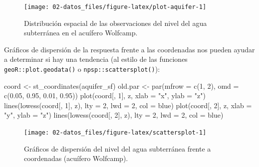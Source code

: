 \documentclass[
  spanish,
]{book}
\newenvironment{Shaded}{\begin{snugshade}}{\end{snugshade}}
\newcommand{\AttributeTok}[1]{\textcolor[rgb]{0.77,0.63,0.00}{#1}}
\newcommand{\DecValTok}[1]{\textcolor[rgb]{0.00,0.00,0.81}{#1}}
\newcommand{\FloatTok}[1]{\textcolor[rgb]{0.00,0.00,0.81}{#1}}
\newcommand{\FunctionTok}[1]{\textcolor[rgb]{0.00,0.00,0.00}{#1}}
\newcommand{\NormalTok}[1]{#1}
\newcommand{\OtherTok}[1]{\textcolor[rgb]{0.56,0.35,0.01}{#1}}
\newcommand{\StringTok}[1]{\textcolor[rgb]{0.31,0.60,0.02}{#1}}
\theoremstyle{break}
\theoremstyle{definition}
\theoremstyle{definition}
\theoremstyle{definition}
\theoremstyle{definition}
\theoremstyle{remark}
\begin{document}
\begin{figure}[!htb]

{\centering \texttt{[image: 02-datos\_files/figure-latex/plot-aquifer-1]} 

}

\caption{Distribución espacial de las observaciones del nivel del agua subterránea en el acuífero Wolfcamp.}\label{fig:plot-aquifer}
\end{figure}

Gráficos de dispersión de la respuesta frente a las coordenadas nos pueden ayudar a determinar si hay una tendencia (al estilo de las funciones \texttt{geoR::plot.geodata()} o \texttt{npsp::scattersplot()}):

\begin{Shaded}
\begin{Highlighting}[]
\NormalTok{coord }\OtherTok{\textless{}{-}} \FunctionTok{st\_coordinates}\NormalTok{(aquifer\_sf)}
\NormalTok{old.par }\OtherTok{\textless{}{-}} \FunctionTok{par}\NormalTok{(}\AttributeTok{mfrow =} \FunctionTok{c}\NormalTok{(}\DecValTok{1}\NormalTok{, }\DecValTok{2}\NormalTok{), }\AttributeTok{omd =} \FunctionTok{c}\NormalTok{(}\FloatTok{0.05}\NormalTok{, }\FloatTok{0.95}\NormalTok{, }\FloatTok{0.01}\NormalTok{, }\FloatTok{0.95}\NormalTok{))}
\FunctionTok{plot}\NormalTok{(coord[, }\DecValTok{1}\NormalTok{], z, }\AttributeTok{xlab =} \StringTok{"x"}\NormalTok{, }\AttributeTok{ylab =} \StringTok{"z"}\NormalTok{)}
\FunctionTok{lines}\NormalTok{(}\FunctionTok{lowess}\NormalTok{(coord[, }\DecValTok{1}\NormalTok{], z), }\AttributeTok{lty =} \DecValTok{2}\NormalTok{, }\AttributeTok{lwd =} \DecValTok{2}\NormalTok{, }\AttributeTok{col =} \StringTok{\textquotesingle{}blue\textquotesingle{}}\NormalTok{)}
\FunctionTok{plot}\NormalTok{(coord[, }\DecValTok{2}\NormalTok{], z, }\AttributeTok{xlab =} \StringTok{"y"}\NormalTok{, }\AttributeTok{ylab =} \StringTok{"z"}\NormalTok{)}
\FunctionTok{lines}\NormalTok{(}\FunctionTok{lowess}\NormalTok{(coord[, }\DecValTok{2}\NormalTok{], z), }\AttributeTok{lty =} \DecValTok{2}\NormalTok{, }\AttributeTok{lwd =} \DecValTok{2}\NormalTok{, }\AttributeTok{col =} \StringTok{\textquotesingle{}blue\textquotesingle{}}\NormalTok{)}
\end{Highlighting}
\end{Shaded}

\begin{figure}[!htb]

{\centering \texttt{[image: 02-datos\_files/figure-latex/scattersplot-1]} 

}

\caption{Gráficos de dispersión del nivel del agua subterránea frente a coordenadas (acuífero Wolfcamp).}\label{fig:scattersplot}
\end{figure}
\end{document}
